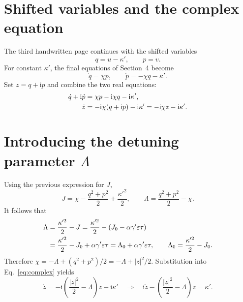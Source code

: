 \documentclass[11pt,a4paper]{article}
\begin{document}
\section{Shifted variables and the complex equation}
The third handwritten page continues with the shifted variables
\begin{equation}
q=u-\kappa',\qquad p=v.
\end{equation}
For constant $\kappa'$, the final equations of Section~4 become
\begin{equation}
\boxed{\dot q=\chi p,\qquad \dot p=-\chi q-\kappa'.}
\end{equation}
Set $z=q+\mathrm{i}p$ and combine the two real equations:
\begin{align}
\dot q+\mathrm{i}\dot p
&=\chi p-\mathrm{i}\chi q-\mathrm{i}\kappa',\notag\\
\dot z&=-\mathrm{i}\chi(q+\mathrm{i}p)-\mathrm{i}\kappa'
=-\mathrm{i}\chi z-\mathrm{i}\kappa'.
\label{eq:complex}
\end{align}

\section{Introducing the detuning parameter $\Lambda$}
Using the previous expression for $J$,
\begin{equation}
J=\chi-\frac{q^2+p^2}{2}+\frac{\kappa'^2}{2},
\qquad \Lambda=\frac{q^2+p^2}{2}-\chi.
\end{equation}
It follows that
\begin{align}
\Lambda
&=\frac{\kappa'^2}{2}-J
=\frac{\kappa'^2}{2}-(J_0-\alpha\gamma'\varepsilon\tau)\notag\\
&=\frac{\kappa'^2}{2}-J_0+\alpha\gamma'\varepsilon\tau
=\Lambda_0+\alpha\gamma'\varepsilon\tau,
\qquad \Lambda_0=\frac{\kappa'^2}{2}-J_0.
\end{align}
Therefore $\chi=-\Lambda+(q^2+p^2)/2=-\Lambda+|z|^2/2$.
Substitution into Eq.~\eqref{eq:complex} yields
\begin{equation}
\dot z=-\mathrm{i}\left(\frac{|z|^2}{2}-\Lambda\right)z
-\mathrm{i}\kappa'
\quad\Longrightarrow\quad
\boxed{\mathrm{i}\dot z-\left(\frac{|z|^2}{2}-\Lambda\right)z=\kappa'.}
\end{equation}
\end{document}
